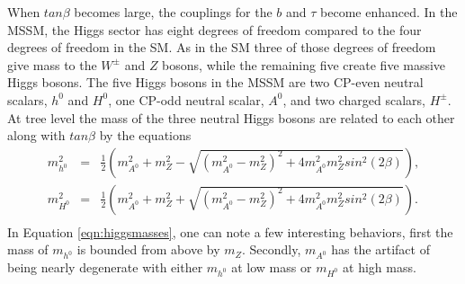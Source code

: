When $tan\beta$ becomes large, the couplings for the $b$ and $\tau$ become enhanced. 
In the MSSM, the Higgs sector has eight degrees of freedom compared to the four degrees of freedom in the SM. 
As in the SM three of those degrees of freedom give mass to the $W^{\pm}$ and $Z$ bosons, while the remaining five create five massive Higgs bosons.
The five Higgs bosons in the MSSM are two CP-even neutral scalars, $h^{0}$ and $H^{0}$, one CP-odd neutral scalar, $A^{0}$, and two charged scalars, $H^{\pm}$.
At tree level the mass of the three neutral Higgs bosons are related to each other along with $tan\beta$ by the equations
\begin{equation}
\begin{array}{rcl}
\label{eqn:higgsmasses}
m_{h^{0}}^{2} & = & \frac{1}{2}\left(m_{A^{0}}^{2} + m_{Z}^{2} - \sqrt{\left(m_{A^{0}}^{2} - m_{Z}^{2}\right)^{2} + 4m_{A^{0}}^{2}m_{Z}^{2}sin^{2}(2\beta)}\right), \\
m_{H^{0}}^{2} & = & \frac{1}{2}\left(m_{A^{0}}^{2} + m_{Z}^{2} + \sqrt{\left(m_{A^{0}}^{2} - m_{Z}^{2}\right)^{2} + 4m_{A^{0}}^{2}m_{Z}^{2}sin^{2}(2\beta)}\right). \\
\end{array}
\end{equation}
In Equation \ref{eqn:higgsmasses}, one can note a few interesting behaviors, first the mass of $m_{h^{0}}$ is bounded from above by $m_{Z}$.
Secondly, $m_{A^{0}}$ has the artifact of being nearly degenerate with either $m_{h^{0}}$ at low mass or $m_{H^{0}}$ at high mass.

